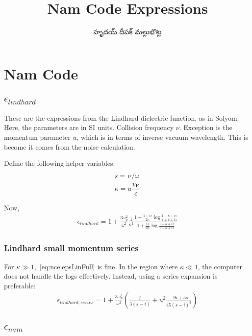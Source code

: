 \documentclass[../main.tex]{subfiles}
\title{Nam Code Expressions}
\author{\begin{telugu}హృదయ్ దీపక్ మల్లుభొట్ల\end{telugu}}
\date{}
\begin{document}
	\onlyinsubfile{\maketitle}

	\section{Nam Code} \label{sec:nce}

	\subsection{$\epsilon_{lindhard}$} \label{subsec:nce:epsl}

	These are the expressions from the Lindhard dielectric function, as in Solyom\supercite{SolyomV3}.
	Here, the parameters are in SI units.
	Collision frequency $\nu$.
	Exception is the momentum parameter $u$, which is in terms of inverse vacuum wavelength.
	This is become it comes from the noise calculation.

	Define the following helper variables:
	\begin{gather}
		s = \flatfrac{\nu}{\omega} \\
		\kappa = u \frac{\vf}{c}
	\end{gather}

	Now,
	\begin{gather}
		\epsilon_{lindhard} = 1 + \frac{3 \omega_p^2}{\omega^2} \frac{1}{\kappa^2} \frac{1 +\frac{1 + is}{2 \kappa} \log \frac{1 - \kappa + i s}{1 + \kappa + i s}}{1 + \frac{is}{2 \kappa} \log \frac{1 - \kappa + i s}{1 + \kappa + i s}} \label{eq:nce:epsLinFull}
	\end{gather}

	\subsubsection{Lindhard small momentum series}

	For $\kappa \gg 1$,~\eqref{eq:nce:epsLinFull} is fine.
	In the region where $\kappa \ll 1$, the computer does not handle the logs effectively.
	Instead, using a series expansion is preferable:
	\begin{gather}
		\epsilon_{lindhard, series} = 1 + \frac{3 \omega_p^2}{\omega^2} \left(\frac{i}{3 (s - i)} + u^2  \frac{-9i + 5 s}{45 (s - i)^3} \right)
	\end{gather}

	\subsection{$\epsilon_{nam}$} \label{subsec:nce:epsn}
\end{document}
